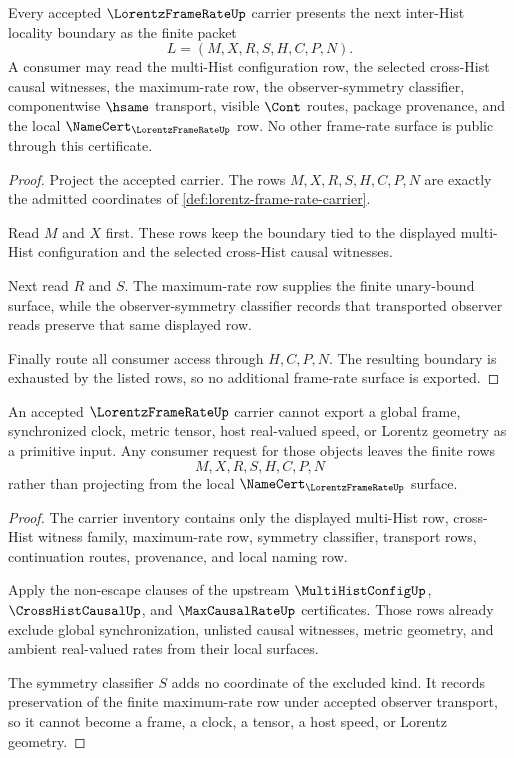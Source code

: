 \begin{theorem}
\label{thm:lorentz-frame-rate-boundary}
Every accepted $\LorentzFrameRateUp$ carrier presents the next inter-Hist locality boundary as the finite packet
$$
L=(M,X,R,S,H,C,P,N).
$$
A consumer may read the multi-Hist configuration row, the selected cross-Hist causal witnesses, the maximum-rate row, the observer-symmetry classifier, componentwise $\hsame$ transport, visible $\Cont$ routes, package provenance, and the local $\NameCert_{\LorentzFrameRateUp}$ row. No other frame-rate surface is public through this certificate.
\end{theorem}
\begin{proof}
Project the accepted carrier. The rows $M,X,R,S,H,C,P,N$ are exactly the admitted coordinates of \autoref{def:lorentz-frame-rate-carrier}.

Read $M$ and $X$ first. These rows keep the boundary tied to the displayed multi-Hist configuration and the selected cross-Hist causal witnesses.

Next read $R$ and $S$. The maximum-rate row supplies the finite unary-bound surface, while the observer-symmetry classifier records that transported observer reads preserve that same displayed row.

Finally route all consumer access through $H,C,P,N$. The resulting boundary is exhausted by the listed rows, so no additional frame-rate surface is exported.
\end{proof}

\begin{theorem}
\label{thm:lorentz-frame-rate-non-escape}
An accepted $\LorentzFrameRateUp$ carrier cannot export a global frame, synchronized clock, metric tensor, host real-valued speed, or Lorentz geometry as a primitive input. Any consumer request for those objects leaves the finite rows
$$
M,X,R,S,H,C,P,N
$$
rather than projecting from the local $\NameCert_{\LorentzFrameRateUp}$ surface.
\end{theorem}
\begin{proof}
The carrier inventory contains only the displayed multi-Hist row, cross-Hist witness family, maximum-rate row, symmetry classifier, transport rows, continuation routes, provenance, and local naming row.

Apply the non-escape clauses of the upstream $\MultiHistConfigUp$, $\CrossHistCausalUp$, and $\MaxCausalRateUp$ certificates. Those rows already exclude global synchronization, unlisted causal witnesses, metric geometry, and ambient real-valued rates from their local surfaces.

The symmetry classifier $S$ adds no coordinate of the excluded kind. It records preservation of the finite maximum-rate row under accepted observer transport, so it cannot become a frame, a clock, a tensor, a host speed, or Lorentz geometry.
\end{proof}

